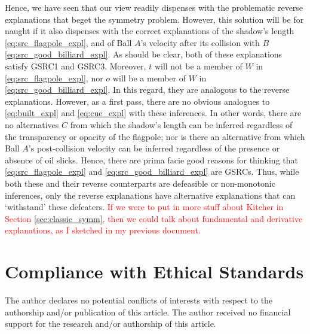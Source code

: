 \documentclass{svjour3}                     %
\begin{document}
\indent Hence, we have seen that our view readily dispenses with the problematic reverse explanations that beget the symmetry problem. However, this solution will be for naught if it also dispenses with the correct explanations of the shadow's length \eqref{eq:src_flagpole_expl}, and of Ball $A$'s velocity after its collision with $B$ \eqref{eq:src_good_billiard_expl}. As should be clear, both of these explanations satisfy GSRC1 and GSRC3. Moreover, $t$ will not be a member of $W$ in \eqref{eq:src_flagpole_expl}, nor $o$ will be a member of $W$ in \eqref{eq:src_good_billiard_expl}. In this regard, they are analogous to the reverse explanations. However, as a first pass, there are no obvious analogues to \eqref{eq:built_expl} and \eqref{eq:cue_expl} with these inferences. In other words, there are no alternatives $C$ from which the shadow's length can be inferred regardless of the transparency or opacity of the flagpole; nor is there an alternative from which Ball $A$'s post-collision velocity can be inferred regardless of the presence or absence of oil slicks. Hence, there are prima facie good reasons for thinking that \eqref{eq:src_flagpole_expl} and \eqref{eq:src_good_billiard_expl} are GSRCs. Thus, while both these and their reverse counterparts are defeasible or non-monotonic inferences, only the reverse explanations have alternative explanations that can `withstand' these defeaters.\newline
\indent \textcolor{red}{If we were to put in more stuff about Kitcher in Section \ref{sec:classic_symm}, then we could talk about fundamental and derivative explanations, as I sketched in my previous document.}


\section{Compliance with Ethical Standards}
The author declares no potential conflicts of interests with respect to the authorship and/or publication of this article. The author received no financial support for the research and/or authorship of this article.



 

%
%
%
%
\end{document}
